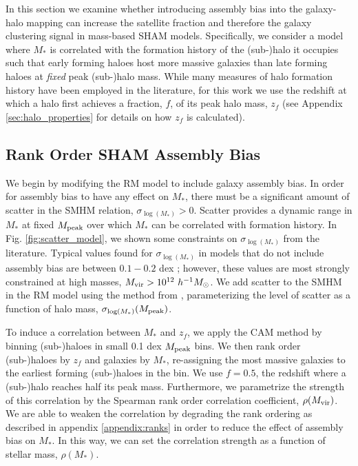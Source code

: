 \documentclass[useAMS,fleqn,usenatbib]{mnras}
\begin{document}
In this section we examine whether introducing assembly bias into the galaxy-halo mapping can increase the satellite fraction and therefore the galaxy clustering signal in mass-based SHAM models.  Specifically, we consider a model where $M_{*}$ is correlated with the formation history of the (sub-)halo it occupies such that early forming haloes host more massive galaxies than late forming haloes at {\em fixed} peak (sub-)halo mass.  While many measures of halo formation history have been employed in the literature, for this work we use the redshift at which a halo first achieves a fraction, $f$, of its peak halo mass, $z_{f}$ (see Appendix \ref{sec:halo_properties} for details on how $z_{f}$ is calculated).


\subsection{Rank Order SHAM Assembly Bias}

We begin by modifying the RM model to include galaxy assembly bias.  In order for assembly bias to have any effect on $M_*$, there must be a significant amount of scatter in the SMHM relation, $\sigma_{\log(M_*)} >0$.  Scatter provides a dynamic range in $M_*$ at fixed $M_{\rm peak}$ over which $M_*$ can be correlated with formation history.  In Fig. \ref{fig:scatter_model}, we shown some constraints on $\sigma_{\log(M_*)}$ from the literature.   Typical values found for $\sigma_{\log(M_*)}$ in models that do not include assembly bias are between $0.1-0.2$ dex \citep{More:2011il, Reddick:2013gi, Zu:2015vh, Zentner:2016tz, Tinker:2016vu, Lehmann:2017fy}; however, these values are most strongly constrained at high masses, $M_{\rm vir}>10^{12}~h^{-1}M_{\odot}$.  We add scatter to the SMHM in the RM model using the method from \citet{Behroozi:2010ja}, parameterizing the level of scatter as a function of halo mass, $\sigma_{\log(M_*)}(M_{\rm peak})$.   

To induce a correlation between $M_{*}$ and $z_{f}$, we apply the CAM method by binning (sub-)haloes in small 0.1 dex $M_{\rm peak}$ bins. We then rank order (sub-)haloes by $z_{f}$ and galaxies by $M_{*}$, re-assigning the most massive galaxies to the earliest forming (sub-)haloes in the bin.  We use ${f}=0.5$, the redshift where a (sub-)halo reaches half its peak mass.  Furthermore, we parametrize the strength of this correlation by the Spearman rank order correlation coefficient, $\rho(M_{\rm vir})$.  We are able to weaken the correlation by degrading the rank ordering as described in appendix \ref{appendix:ranks} in order to reduce the effect of assembly bias on $M_*$.  In this way, we can set the correlation strength as a function of stellar mass, $\rho(M_*)$.
\end{document}
